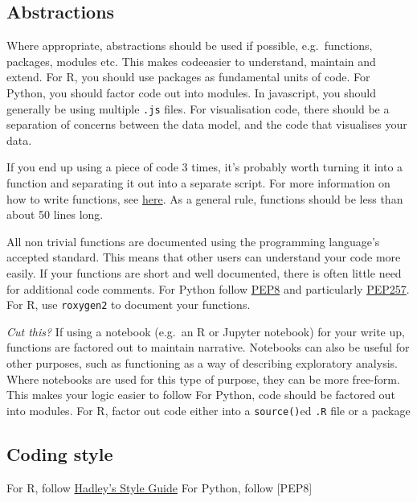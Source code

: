 \documentclass[]{book}
\begin{document}
\hypertarget{functions}{%
\subsection{Abstractions}\label{functions}}

Where appropriate, abstractions should be used if possible, e.g.~functions, packages, modules etc. This makes codeeasier to understand, maintain and extend.
For R, you should use packages as fundamental units of code. For Python, you should factor code out into modules. In javascript, you should generally be using multiple \texttt{.js} files. For visualisation code, there should be a separation of concerns between the data model, and the code that visualises your data.

If you end up using a piece of code 3 times, it's probably worth turning it into a function and separating it out into a separate script. For more information on how to write functions, see \href{https://github.com/moj-analytical-services/writing_functions_in_r}{here}. As a general rule, functions should be less than about 50 lines long.

All non trivial functions are documented using the programming language's accepted standard.
This means that other users can understand your code more easily. If your functions are short and well documented, there is often little need for additional code comments.
For Python follow \href{https://www.python.org/dev/peps/pep-0008/}{PEP8} and particularly \href{https://www.python.org/dev/peps/pep-0257/}{PEP257}.
For R, use \texttt{roxygen2} to document your functions.

\emph{Cut this?}
If using a notebook (e.g.~an R or Jupyter notebook) for your write up, functions are factored out to maintain narrative. Notebooks can also be useful for other purposes, such as functioning as a way of describing exploratory analysis. Where notebooks are used for this type of purpose, they can be more free-form. This makes your logic easier to follow For Python, code should be factored out into modules. For R, factor out code either into a \texttt{source()}ed \texttt{.R} file or a package

\hypertarget{style}{%
\subsection{Coding style}\label{style}}

For R, follow \href{http://adv-r.had.co.nz/Style.html}{Hadley's Style Guide}
For Python, follow {[}PEP8{]}
\end{document}
